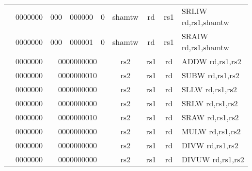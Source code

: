 \begin{table}[p]
\begin{small}
\begin{center}
\begin{tabular}{rcccccccccl}
&
\multicolumn{1}{|c|}{0000000} &
\multicolumn{2}{c|}{000} &
\multicolumn{2}{c|}{000000} &
\multicolumn{1}{c|}{0} &
\multicolumn{1}{c|}{shamtw} &
\multicolumn{1}{c|}{rd} &
\multicolumn{1}{c|}{rs1} & SRLIW rd,rs1,shamtw \\
\cline{2-10}
  

&
\multicolumn{1}{|c|}{0000000} &
\multicolumn{2}{c|}{000} &
\multicolumn{2}{c|}{000001} &
\multicolumn{1}{c|}{0} &
\multicolumn{1}{c|}{shamtw} &
\multicolumn{1}{c|}{rd} &
\multicolumn{1}{c|}{rs1} & SRAIW rd,rs1,shamtw \\
\cline{2-10}
  

&
\multicolumn{1}{|c|}{0000000} &
\multicolumn{5}{c|}{0000000000} &
\multicolumn{1}{c|}{rs2} &
\multicolumn{1}{c|}{rs1} &
\multicolumn{1}{c|}{rd} & ADDW rd,rs1,rs2 \\
\cline{2-10}
  

&
\multicolumn{1}{|c|}{0000000} &
\multicolumn{5}{c|}{0000000010} &
\multicolumn{1}{c|}{rs2} &
\multicolumn{1}{c|}{rs1} &
\multicolumn{1}{c|}{rd} & SUBW rd,rs1,rs2 \\
\cline{2-10}
  

&
\multicolumn{1}{|c|}{0000000} &
\multicolumn{5}{c|}{0000000000} &
\multicolumn{1}{c|}{rs2} &
\multicolumn{1}{c|}{rs1} &
\multicolumn{1}{c|}{rd} & SLLW rd,rs1,rs2 \\
\cline{2-10}
  

&
\multicolumn{1}{|c|}{0000000} &
\multicolumn{5}{c|}{0000000000} &
\multicolumn{1}{c|}{rs2} &
\multicolumn{1}{c|}{rs1} &
\multicolumn{1}{c|}{rd} & SRLW rd,rs1,rs2 \\
\cline{2-10}
  

&
\multicolumn{1}{|c|}{0000000} &
\multicolumn{5}{c|}{0000000010} &
\multicolumn{1}{c|}{rs2} &
\multicolumn{1}{c|}{rs1} &
\multicolumn{1}{c|}{rd} & SRAW rd,rs1,rs2 \\
\cline{2-10}
  

&
\multicolumn{1}{|c|}{0000000} &
\multicolumn{5}{c|}{0000000000} &
\multicolumn{1}{c|}{rs2} &
\multicolumn{1}{c|}{rs1} &
\multicolumn{1}{c|}{rd} & MULW rd,rs1,rs2 \\
\cline{2-10}
  

&
\multicolumn{1}{|c|}{0000000} &
\multicolumn{5}{c|}{0000000000} &
\multicolumn{1}{c|}{rs2} &
\multicolumn{1}{c|}{rs1} &
\multicolumn{1}{c|}{rd} & DIVW rd,rs1,rs2 \\
\cline{2-10}
  

&
\multicolumn{1}{|c|}{0000000} &
\multicolumn{5}{c|}{0000000000} &
\multicolumn{1}{c|}{rs2} &
\multicolumn{1}{c|}{rs1} &
\multicolumn{1}{c|}{rd} & DIVUW rd,rs1,rs2 \\
\cline{2-10}
  


\end{tabular}
\end{center}
\end{small}
\end{table}

